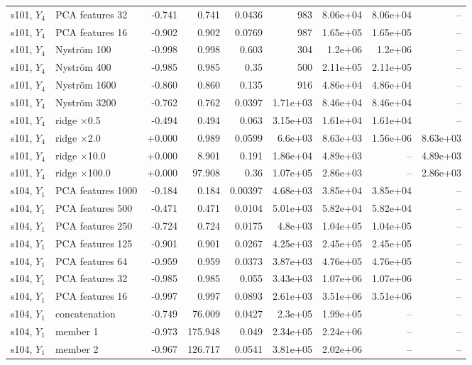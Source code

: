 \begin{landscape}
{\begin{longtable}{llrrrrrrr}
s101, $Y_4$ & PCA features 32 & -0.741 & 0.741 & 0.0436 & 983 & 8.06e+04 & 8.06e+04 & -- \\
s101, $Y_4$ & PCA features 16 & -0.902 & 0.902 & 0.0769 & 987 & 1.65e+05 & 1.65e+05 & -- \\
s101, $Y_4$ & Nystr\"om 100 & -0.998 & 0.998 & 0.603 & 304 & 1.2e+06 & 1.2e+06 & -- \\
s101, $Y_4$ & Nystr\"om 400 & -0.985 & 0.985 & 0.35 & 500 & 2.11e+05 & 2.11e+05 & -- \\
s101, $Y_4$ & Nystr\"om 1600 & -0.860 & 0.860 & 0.135 & 916 & 4.86e+04 & 4.86e+04 & -- \\
s101, $Y_4$ & Nystr\"om 3200 & -0.762 & 0.762 & 0.0397 & 1.71e+03 & 8.46e+04 & 8.46e+04 & -- \\
s101, $Y_4$ & ridge $\times$0.5 & -0.494 & 0.494 & 0.063 & 3.15e+03 & 1.61e+04 & 1.61e+04 & -- \\
s101, $Y_4$ & ridge $\times$2.0 & +0.000 & 0.989 & 0.0599 & 6.6e+03 & 8.63e+03 & 1.56e+06 & 8.63e+03 \\
s101, $Y_4$ & ridge $\times$10.0 & +0.000 & 8.901 & 0.191 & 1.86e+04 & 4.89e+03 & -- & 4.89e+03 \\
s101, $Y_4$ & ridge $\times$100.0 & +0.000 & 97.908 & 0.36 & 1.07e+05 & 2.86e+03 & -- & 2.86e+03 \\
s104, $Y_1$ & PCA features 1000 & -0.184 & 0.184 & 0.00397 & 4.68e+03 & 3.85e+04 & 3.85e+04 & -- \\
s104, $Y_1$ & PCA features 500 & -0.471 & 0.471 & 0.0104 & 5.01e+03 & 5.82e+04 & 5.82e+04 & -- \\
s104, $Y_1$ & PCA features 250 & -0.724 & 0.724 & 0.0175 & 4.8e+03 & 1.04e+05 & 1.04e+05 & -- \\
s104, $Y_1$ & PCA features 125 & -0.901 & 0.901 & 0.0267 & 4.25e+03 & 2.45e+05 & 2.45e+05 & -- \\
s104, $Y_1$ & PCA features 64 & -0.959 & 0.959 & 0.0373 & 3.87e+03 & 4.76e+05 & 4.76e+05 & -- \\
s104, $Y_1$ & PCA features 32 & -0.985 & 0.985 & 0.055 & 3.43e+03 & 1.07e+06 & 1.07e+06 & -- \\
s104, $Y_1$ & PCA features 16 & -0.997 & 0.997 & 0.0893 & 2.61e+03 & 3.51e+06 & 3.51e+06 & -- \\
s104, $Y_1$ & concatenation & -0.749 & 76.009 & 0.0427 & 2.3e+05 & 1.99e+05 & -- & -- \\
s104, $Y_1$ & member 1 & -0.973 & 175.948 & 0.049 & 2.34e+05 & 2.24e+06 & -- & -- \\
s104, $Y_1$ & member 2 & -0.967 & 126.717 & 0.0541 & 3.81e+05 & 2.02e+06 & -- & -- \\

\end{longtable}}
\end{landscape}
